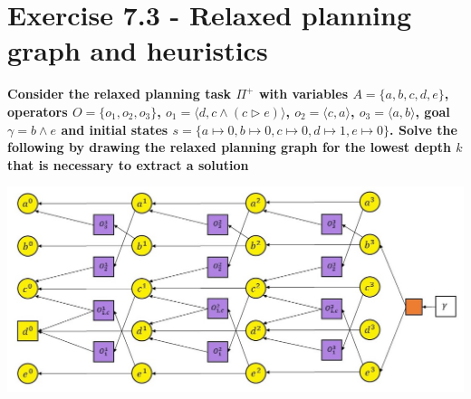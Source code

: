 \documentclass[12pt,a4paper]{article}
\begin{document}
\section*{Exercise 7.3 - Relaxed planning graph and heuristics}

\textbf{Consider the relaxed planning task $\Pi^+$ with variables 
$A=\{a,b,c,d,e\}$, operators $O=\{o_1,o_2,o_3\}$, $o_1=\langle d, c \land (c \triangleright e)\rangle$,
$o_2= \langle c , a \rangle$, $o_3= \langle a, b\rangle$, goal
$\gamma = b \land e$ and initial states $s=\{ a\mapsto 0, 
b\mapsto 0, c \mapsto 0, d \mapsto 1, e \mapsto 0 \}$. Solve the following
by drawing the relaxed planning graph for the lowest depth $k$
that is necessary to extract a solution}
\begin{center}
	\includegraphics[scale=0.5]{img1.jpg}\\
\end{center}
\end{document}
